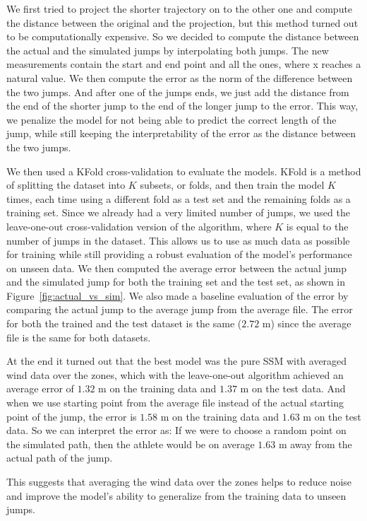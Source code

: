 \documentclass[sigconf,natbib=false, language=english]{acmart}
\begin{document}
We first tried to project the shorter trajectory on to the other one and
compute the distance between the original and the projection, but this method
turned out to be computationally expensive. So we decided to compute the
distance between the actual and the simulated jumps by interpolating both
jumps. The new measurements contain the start and end point and all the ones,
where x reaches a natural value. We then compute the error as the norm of the
difference between the two jumps. And after one of the jumps ends, we just add
the distance from the end of the shorter jump to the end of the longer jump to
the error. This way, we penalize the model for not being able to predict the
correct length of the jump, while still keeping the interpretability of the
error as the distance between the two jumps.

We then used a KFold cross-validation to evaluate the models. KFold is a method 
of splitting the dataset into $K$ subsets, or folds, and then train the model $K$ times,
each time using a different fold as a test set and the remaining folds as a training set.
Since we already had a very limited number of jumps, we used the leave-one-out 
cross-validation version of the algorithm, where $K$ is equal to the number of jumps 
in the dataset. This allows us to use as much data as possible for training while 
still providing a robust evaluation of the model's performance on unseen data.
We then computed the average error between the actual jump and the simulated jump 
for both the training set and the test set, as shown in Figure~\ref{fig:actual_vs_sim}. 
We also made a baseline evaluation of the error by comparing the actual jump to the
average jump from the average file. The error for both the trained and the test dataset 
is the same ($2.72$ m) since the average file is the same for both datasets.

At the end it turned out that the best model was the pure SSM with averaged wind
data over the zones, which with the leave-one-out algorithm achieved an average 
error of $1.32$ m on the training data and $1.37$ m on the test data. And when we use
starting point from the average file instead of the actual starting point of the 
jump, the error is $1.58$ m on the training data and $1.63$ m on the test data.
So we can interpret the error as: If we were to choose a random point on the simulated
path, then the athlete would be on average $1.63$ m away from the actual path of the jump.

This suggests that averaging the wind data over the zones helps to
reduce noise and improve the model's ability to generalize from the training data 
to unseen jumps.
\end{document}
